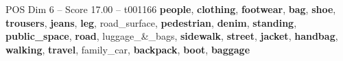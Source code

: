 \begin{textsample}{POS Dim 6 – Score 17.00 – t001166}  \label{ex:f6_pos_014}
\textbf{people}, \textbf{clothing}, \textbf{footwear}, \textbf{bag}, \textbf{shoe}, \textbf{trousers}, \textbf{jeans}, \textbf{leg}, road\_surface, \textbf{pedestrian}, \textbf{denim}, \textbf{standing}, \textbf{public\_space}, \textbf{road}, luggage\_\&\_bags, \textbf{sidewalk}, \textbf{street}, \textbf{jacket}, \textbf{handbag}, \textbf{walking}, \textbf{travel}, family\_car, \textbf{backpack}, \textbf{boot}, \textbf{baggage}

\end{textsample}
